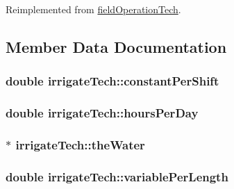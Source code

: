 Reimplemented from \hyperlink{classfield_operation_tech_ab0b2bf71efca78b637837fc4d0e3a9d4}{fieldOperationTech}.

\subsection{Member Data Documentation}
\hypertarget{classirrigate_tech_ac0791878396871b90eea5fdcc5c8b9f8}{
\subsubsection[{constantPerShift}]{\setlength{\rightskip}{0pt plus 5cm}double {\bf irrigateTech::constantPerShift}}}
\label{classirrigate_tech_ac0791878396871b90eea5fdcc5c8b9f8}
\hypertarget{classirrigate_tech_aee8b8e08f7b55f4961240de7f5735b08}{
\subsubsection[{hoursPerDay}]{\setlength{\rightskip}{0pt plus 5cm}double {\bf irrigateTech::hoursPerDay}}}
\label{classirrigate_tech_aee8b8e08f7b55f4961240de7f5735b08}
\hypertarget{classirrigate_tech_a8b2c236b29c9694cfc58c119dcc3466b}{
\subsubsection[{theWater}]{$\ast$ {\bf irrigateTech::theWater}}}
\label{classirrigate_tech_a8b2c236b29c9694cfc58c119dcc3466b}
\hypertarget{classirrigate_tech_a52efb2478036767847d634779f039c9d}{
\subsubsection[{variablePerLength}]{\setlength{\rightskip}{0pt plus 5cm}double {\bf irrigateTech::variablePerLength}}}
